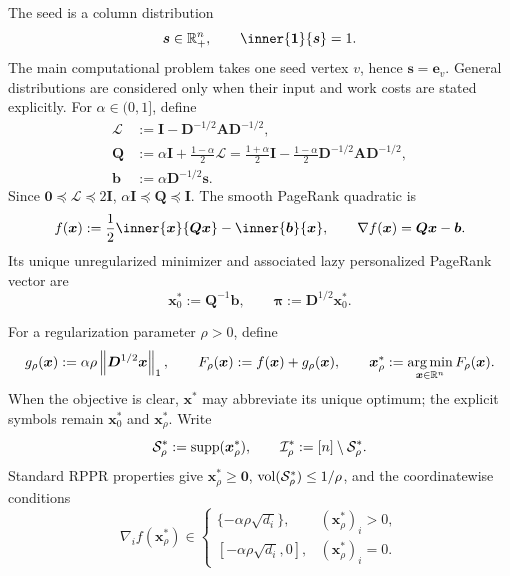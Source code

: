 The seed is a column distribution
\begin{equation}
    \bm{s}\in\R_+^n,
    \qquad
    \inner{\one}{\bm{s}}=1.
    \label{eq:shared-seed}
\end{equation}
The main computational problem takes one seed vertex \(v\), hence
\(\bm{s}=\bm{e}_v\). General distributions are considered only when
their input and work costs are stated explicitly. For
\(\alpha\in(0,1]\), define
\begin{equation}
\begin{aligned}
    \bm{\mathcal L}&:=\bm{I}-\bm{D}^{-1/2}\bm{A}\bm{D}^{-1/2},\\
    \bm{Q}&:=\alpha\bm{I}+\frac{1-\alpha}{2}\bm{\mathcal L}
      =\frac{1+\alpha}{2}\bm{I}
       -\frac{1-\alpha}{2}\bm{D}^{-1/2}\bm{A}\bm{D}^{-1/2},\\
    \bm{b}&:=\alpha\bm{D}^{-1/2}\bm{s}.
\end{aligned}
    \label{eq:shared-pagerank-matrices}
\end{equation}
Since \(\bm{0}\preceq\bm{\mathcal L}\preceq2\bm{I}\),
\(\alpha\bm{I}\preceq\bm{Q}\preceq\bm{I}\). The smooth PageRank
quadratic is
\begin{equation}
    f(\bm{x}):=\frac12\inner{\bm{x}}{\bm{Q}\bm{x}}-\inner{\bm{b}}{\bm{x}},
    \qquad
    \nabla f(\bm{x})=\bm{Q}\bm{x}-\bm{b}.
    \label{eq:shared-pagerank-objective}
\end{equation}
Its unique unregularized minimizer and associated lazy personalized PageRank
vector are
\begin{equation}
    \bm{x}_0^*:=\bm{Q}^{-1}\bm{b},
    \qquad
    \bm{\pi}:=\bm{D}^{1/2}\bm{x}_0^*.
    \label{eq:shared-ppr-solution}
\end{equation}

For a regularization parameter \(\rho>0\), define
\begin{equation}
    g_\rho(\bm{x}):=\alpha\rho\left\lVert \bm{D}^{1/2}\bm{x}\right\rVert_1,
    \qquad
    F_\rho(\bm{x}):=f(\bm{x})+g_\rho(\bm{x}),
    \qquad
    \bm{x}_\rho^*:=\operatorname*{arg\,min}_{\bm{x}\in\mathbb{R}^n}F_\rho(\bm{x}).
    \label{eq:shared-rppr-objective}
\end{equation}
When the objective is clear, \(\bm{x}^*\) may abbreviate its unique optimum;
the explicit symbols remain \(\bm{x}_0^*\) and \(\bm{x}_\rho^*\). Write
\[
    \mathcal{S}_\rho^*:=\operatorname{supp}(\bm{x}_\rho^*),
    \qquad
    \mathcal{I}_\rho^*:=[n]\setminus\mathcal{S}_\rho^*.
\]
Standard RPPR properties give \(\bm{x}_\rho^*\geq\bm{0}\),
\(\operatorname{vol}(\mathcal{S}_\rho^*)\leq1/\rho\), and the coordinatewise conditions
\begin{equation}
    \nabla_i f(\bm{x}_\rho^*)
    \in
    \begin{cases}
        \{-\alpha\rho\sqrt{d_i}\}, & (\bm{x}_\rho^*)_i>0,\\
        [-\alpha\rho\sqrt{d_i},0], & (\bm{x}_\rho^*)_i=0.
    \end{cases}
    \label{eq:shared-rppr-kkt}
\end{equation}

